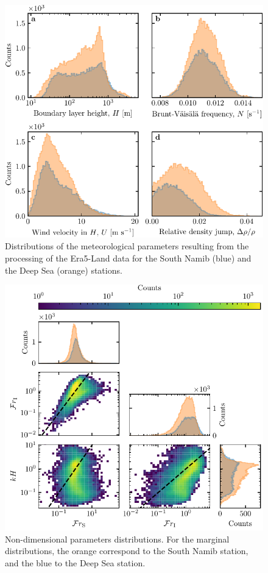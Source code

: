 \begin{figure}
  \centering
  \includegraphics{Figures/Figure10_supp.pdf}
  \caption{Distributions of the meteorological parameters resulting from the processing of the Era5-Land data for the South Namib (blue) and the Deep Sea (orange) stations.}
  \label{Fig10_supp}
\end{figure}

\begin{figure}
  \centering
  \includegraphics[scale=1]{Figures/Figure11_supp.pdf}
  \caption{Non-dimensional parameters distributions. For the marginal distributions, the orange correspond to the South Namib station, and the blue to the Deep Sea station.}
  \label{Fig11_supp}
\end{figure}

